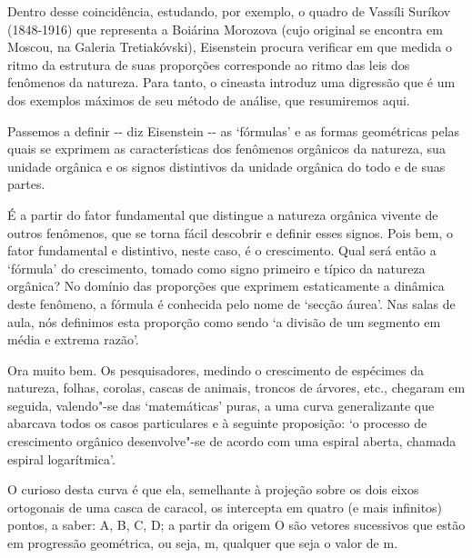 Dentro desse coincidência, estudando, por exemplo, o quadro de Vassíli
Suríkov (1848-1916) que representa a Boiárina Morozova (cujo original se
encontra em Moscou, na Galeria Tretiakóvski), Eisenstein procura
verificar em que medida o ritmo da estrutura de suas proporções
corresponde ao ritmo das leis dos fenômenos da natureza. Para tanto, o
cineasta introduz uma digressão que é um dos exemplos máximos de seu
método de análise, que resumiremos aqui.

Passemos a definir -\/- diz Eisenstein -\/- as `fórmulas' e as formas
geométricas pelas quais se exprimem as características dos fenômenos
orgânicos da natureza, sua unidade orgânica e os signos distintivos da
unidade orgânica do todo e de suas partes.

É a partir do fator fundamental que distingue a natureza orgânica
vivente de outros fenômenos, que se torna fácil descobrir e definir
esses signos. Pois bem, o fator fundamental e distintivo, neste caso, é
o crescimento. Qual será então a `fórmula' do crescimento, tomado como
signo primeiro e típico da natureza orgânica? No domínio das proporções
que exprimem estaticamente a dinâmica deste fenômeno, a fórmula é
conhecida pelo nome de `secção áurea'. Nas salas de aula, nós definimos
esta proporção como sendo `a divisão de um segmento em média e extrema
razão'.

Ora muito bem. Os pesquisadores, medindo o crescimento de espécimes da
natureza, folhas, corolas, cascas de animais, troncos de árvores, etc.,
chegaram em seguida, valendo"-se das `matemáticas' puras, a uma curva
generalizante que abarcava todos os casos particulares e à seguinte
proposição: `o processo de crescimento orgânico desenvolve"-se de acordo
com uma espiral aberta, chamada espiral logarítmica'.


O curioso desta curva é que ela, semelhante à projeção sobre os dois
eixos ortogonais de uma casca de caracol, os intercepta em quatro (e
mais infinitos) pontos, a saber: A, B, C, D; a partir da origem {O} são
vetores sucessivos que estão em progressão geométrica, ou seja,
m, qualquer que seja o valor de {m}.

